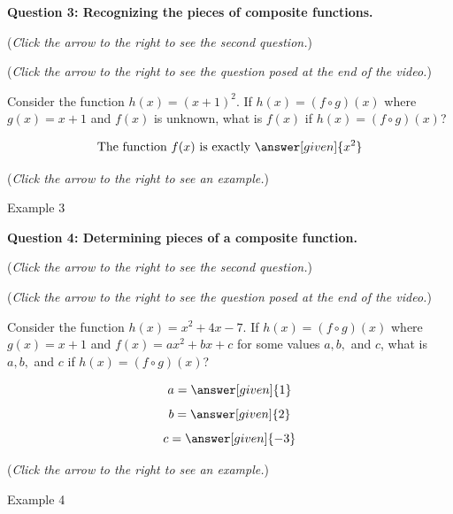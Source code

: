 \documentclass{ximera}
\begin{document}
\textbf{Question 3: Recognizing the pieces of composite functions.}
\begin{question}
\begin{flushright}
{\color{blue}(\emph{Click the arrow to the right to see the second question.})}
\end{flushright}
\begin{center}
\begin{expandable}
{\color{blue}(\emph{Click the arrow to the right to see the question
posed at the end of the video.})}
\begin{expandable}
Consider the function $h(x) = (x + 1)^2$. If $h(x) = (f\circ g)(x)$ where $g(x) = x+1$ and $f(x)$ is unknown, what is $f(x)$ if $h(x) = (f \circ g)(x)$?\\
\begin{prompt}
\[
\text{The function }f(x) \text{ is exactly }\answer[given]{x^2}
\]
\end{prompt}
\begin{flushright}
{\color{blue}(\emph{Click the arrow to the right to see an example.})}
\end{flushright}
\begin{expandable}
Example 3
\end{expandable}
\end{expandable}
\end{expandable}
\end{center}
\end{question}


\textbf{Question 4: Determining pieces of a composite function.}
\begin{question}
\begin{flushright}
{\color{blue}(\emph{Click the arrow to the right to see the second question.})}
\end{flushright}
\begin{center}
\begin{expandable}
{\color{blue}(\emph{Click the arrow to the right to see the question
posed at the end of the video.})}
\begin{expandable}
Consider the function $h(x) = x^2 + 4x - 7$. If $h(x) = (f\circ g)(x)$
where $g(x) = x+1$ and $f(x) = ax^2 + bx + c$ for some values $a,b,$
and $c$, what is $a, b,$ and $c$ if $h(x) = (f\circ g)(x)$?\\
\begin{prompt}
\[
a = \answer[given]{1}
\]
\[
b = \answer[given]{2}
\]
\[
c = \answer[given]{-3}
\]
\end{prompt}
\begin{flushright}
{\color{blue}(\emph{Click the arrow to the right to see an example.})}
\end{flushright}
\begin{expandable}
Example 4
\end{expandable}
\end{expandable}
\end{expandable}
\end{center}
\end{question}
\end{document}
